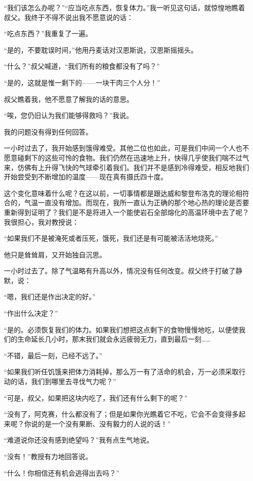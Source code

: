 \documentclass[10pt]{book}
\begin{document}
“我们该怎么办呢？”“应当吃点东西，恢复体力。”我一听见这句话，就惊惶地瞧着叔父。我终于不得不说出我不愿意说的话：

“吃点东西？”我重复了一遍。

“是的，不要耽误时间，”他用丹麦话对汉恩斯说，汉恩斯摇摇头。

“什么？”叔父喊道，“我们所有的粮食都没有了吗？”

“是的，这就是惟一剩下的——一块干肉三个人分！”

叔父瞧着我，他不愿意了解我的话的意思。

“唉，您仍旧认为我们能够得救吗？”我说。

我的问题没有得到任何回答。

一小时过去了，我开始感到饿得难受。其他二位也如此，可是我们中间一个人也不愿意碰剩下的这些可怜的食物。我们仍然在迅速地上升，快得几乎使我们喘不过气来，仿佛有上升得飞快的气球牵引着我们。我们并不是感到冷得难受，相反地我们开始尝受到不断增加的温度——现在真有摄氏四十度。

这个变化意味着什么呢？在这以前，一切事情都是跟达威和黎登布洛克的理论相符合的，气温一直没有增加。而现在，我所一直认为正确的那个地心热的理论是否要重新得到证明了？我们是不是将进入一个能使岩石全部熔化的高温环境中去了呢？我很担心，我对教授说：

“如果我们不是被淹死或者压死，饿死，我们还是有可能被活活地烧死。”

他只是耸耸肩，又开始独自沉思。

一小时过去了。除了气温略有升高以外，情况没有任何改变。叔父终于打破了静默，说：

“嗯，我们还是作出决定的好。”

“作出什么决定？”

“是的。必须恢复我们的体力。如果我们想把这点剩下的食物慢慢地吃，以便使我们的生命延长几小时，那末我们就会永远疲弱无力，直到最后一刻……

“不错，最后一刻，已经不远了。”

“如果我们听任饥饿来把体力消耗掉，那么万一有了活命的机会，万一必须采取行动的话，我们到哪里去寻伐气力呢？”

“可是，叔父，如果把这块内吃了，我们还有什么剩下的呢？”

“没有了，阿克赛，什么都没有了；但是如果你光瞧着它不吃，它会不会变得多起来呢？你说的是一个没有果断、没有毅力的人说的话！”

“难道说你还没有感到绝望吗？”我有点生气地说。

“没有！”教授有力地回答说。

“什么！你相信还有机会逃得出去吗？”
\end{document}
